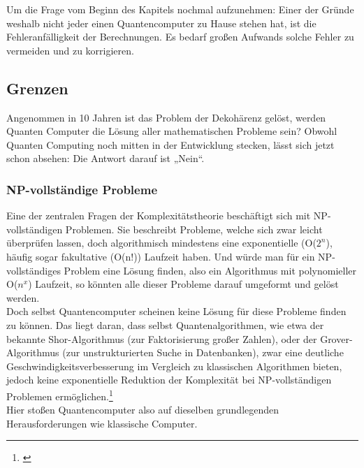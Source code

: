 Um die Frage vom Beginn des Kapitels nochmal aufzunehmen: Einer der Gründe weshalb nicht jeder einen Quantencomputer zu Hause stehen hat, ist die Fehleranfälligkeit der Berechnungen.
Es bedarf großen Aufwands solche Fehler zu vermeiden und zu korrigieren.\\


\subsection{Grenzen}
\label{subsec:grenzen}

Angenommen in 10 Jahren ist das Problem der Dekohärenz gelöst, werden Quanten Computer die Lösung aller mathematischen Probleme sein?
Obwohl Quanten Computing noch mitten in der Entwicklung stecken, lässt sich jetzt schon absehen: Die Antwort darauf ist „Nein“.\\

\subsubsection{NP-vollständige Probleme}
\label{subsubsec:np-vollstaendige-probleme}
Eine der zentralen Fragen der Komplexitätstheorie beschäftigt sich mit NP-vollständigen Problemen.
Sie beschreibt Probleme, welche sich zwar leicht überprüfen lassen, doch algorithmisch mindestens eine exponentielle (O($2^{n}$), häufig sogar fakultative (O(n!)) Laufzeit haben.
Und würde man für ein NP-vollständiges Problem eine Lösung finden, also ein Algorithmus mit polynomieller O($n^{x}$) Laufzeit, so könnten alle dieser Probleme darauf umgeformt und gelöst werden.\\

Doch selbst Quantencomputer scheinen keine Lösung für diese Probleme finden zu können.
Das liegt daran, dass selbst Quantenalgorithmen, wie etwa der bekannte Shor-Algorithmus (zur Faktorisierung großer Zahlen),
oder der Grover-Algorithmus (zur unstrukturierten Suche in Datenbanken), zwar eine deutliche Geschwindigkeitsverbesserung im Vergleich zu klassischen Algorithmen bieten,
jedoch keine exponentielle Reduktion der Komplexität bei NP-vollständigen Problemen ermöglichen.\footnote{\cite[S. 165]{homeister_quantum_2022}}\\
Hier stoßen Quantencomputer also auf dieselben grundlegenden Herausforderungen wie klassische Computer.\\


